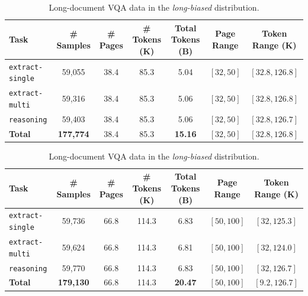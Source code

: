 \documentclass{llmxive}
\providecommand{\emph}[1]{\textit{#1}}
\providecommand{\extractsingle}{\texttt{extract-single}\xspace}
\providecommand{\extractmulti}{\texttt{extract-multi}\xspace}
\providecommand{\reasoningtask}{\texttt{reasoning}\xspace}
\begin{document}
{{{\begin{table}[!htbp]
 \centering
 \setlength{\tabcolsep}{2.5pt}
 \small
 \begin{subtable}{\linewidth}
 \centering
 \setlength{\tabcolsep}{2pt}
 \caption{Long-document VQA data in the \emph{pool-native} Distribution (default).}
 \label{tab:longvqa_uniform_data_stats}
 \begin{tabular}{lcccccc}
 \toprule
 \textbf{Task} & \textbf{\# Samples} & \textbf{\# Pages} & \textbf{\# Tokens (K)} & \textbf{Total Tokens (B)} & \textbf{Page Range} & \textbf{Token Range (K)} \\
 \midrule
 \extractsingle & 59{,}055 & 38.4 & 85.3 & 5.04 & $[32, 50]$ & $[32.8, 126.8]$ \\
 \extractmulti & 59{,}316 & 38.4 & 85.3 & 5.06 & $[32, 50]$ & $[32.8, 126.8]$ \\
 \reasoningtask & 59{,}403 & 38.4 & 85.3 & 5.06 & $[32, 50]$ & $[32.8, 126.7]$ \\
 \midrule
 \textbf{Total} & \textbf{177{,}774} & 38.4 & 85.3 & \textbf{15.16} & $[32, 50]$ & $[32.8, 126.8]$ \\
 \bottomrule
 \end{tabular}
 \end{subtable}

 \begin{subtable}{\linewidth}
 \centering
 \setlength{\tabcolsep}{2pt}
 \caption{Long-document VQA data in the \emph{long-biased} distribution.}
 \label{tab:longvqa_non_even_data_stats}
 \begin{tabular}{lcccccc}
 \toprule
 \textbf{Task} & \textbf{\# Samples} & \textbf{\# Pages} & \textbf{\# Tokens (K)} & \textbf{Total Tokens (B)} & \textbf{Page Range} & \textbf{Token Range (K)} \\
 \midrule
 \extractsingle & 59{,}736 & 66.8 & 114.3 & 6.83 & $[50, 100]$ & $[32, 125.3]$ \\
 \extractmulti & 59{,}624 & 66.8 & 114.3 & 6.81 & $[50, 100]$ & $[32, 124.0]$ \\
 \reasoningtask & 59{,}770 & 66.8 & 114.3 & 6.83 & $[50, 100]$ & $[32, 126.7]$ \\
 \midrule
 \textbf{Total} & \textbf{179{,}130} & 66.8 & 114.3 & \textbf{20.47} & $[50, 100]$ & $[9.2, 126.7]$ \\
 \bottomrule
 \end{tabular}
 \end{subtable}


\end{table}}}}
\end{document}
